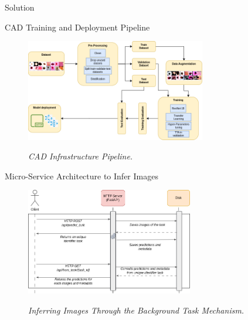 \documentclass[dvipsnames,mathserif]{beamer}
\begin{document}
{\begin{frame}
    \end{frame}



    \begin{frame}
      \begin{center}
        \Huge Solution
      \end{center}
    \end{frame}


    \begin{frame}

      \large CAD Training and Deployment Pipeline
      \vspace{0.25cm}

      \begin{figure}[H]
        \centering
        \includegraphics[width=0.7\textwidth]{images/Pipeline.drawio.png}
        \caption[CAD Infrastructure Pipeline]{\textit{CAD Infrastructure Pipeline.}}
        {\label{fig:cad-infrastructure-training-system}}
      \end{figure}

    \end{frame}

    \begin{frame}
      \large Micro-Service Architecture to Infer Images
      \vspace{0.25cm}

      \begin{figure}[H]
        \centering
        \includegraphics[width=0.65\textwidth]{images/BackgroundTask.drawio.png}
        \caption[Inferring Images Through the Background Task Mechanism]{\textit{Inferring Images Through the Background Task Mechanism.  }}
        {\label{fig:backgrond-task}}
      \end{figure}


\end{frame}}
\end{document}
